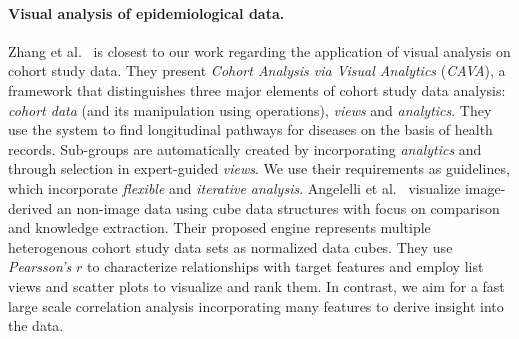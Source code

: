 \documentclass[journal]{style/vgtc} 			          %
\begin{document}
\paragraph{Visual analysis of epidemiological data.}
Zhang et al.~\cite{Zhang2014, Gotz2014} is closest to our work regarding the application of visual analysis on cohort study data.
They present \emph{Cohort Analysis via Visual Analytics} (\emph{CAVA}), a framework that distinguishes three major elements of cohort study data analysis: \emph{cohort data} (and its manipulation using operations), \emph{views} and \emph{analytics}.
They use the system to find longitudinal pathways for diseases on the basis of health records.
Sub-groups are automatically created by incorporating \emph{analytics} and through selection in expert-guided \emph{views}.
We use their requirements as guidelines, which incorporate \emph{flexible} and \emph{iterative analysis}. %
Angelelli et al.~\cite{Angelelli} visualize image-derived an non-image data using cube data structures with focus on comparison and knowledge extraction.
Their proposed engine represents multiple heterogenous cohort study data sets as normalized data cubes.
They use \emph{Pearsson's} $r$ to characterize relationships with target features and employ list views and scatter plots to visualize and rank them.
In contrast, we aim for a fast large scale correlation analysis incorporating many features to derive insight into the data.
\end{document}
